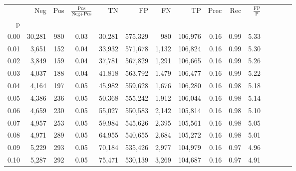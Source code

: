 \begin{tabular}{rrrcrrrrrrrrrrr}
\toprule
{} &     Neg &    Pos & $\frac{\text{Pos}}{\text{Neg}+\text{Pos}}$ &       TN &       FP &       FN &       TP &  Prec &   Rec & $\frac{\text{FP}}{\text{P}}$ \\
p    &         &        &                                            &          &          &          &          &       &       &                              \\
\midrule
0.00 &  30,281 &    980 &                                       0.03 &   30,281 &  575,329 &      980 &  106,976 &  0.16 &  0.99 &                         5.33 \\
0.01 &   3,651 &    152 &                                       0.04 &   33,932 &  571,678 &    1,132 &  106,824 &  0.16 &  0.99 &                         5.30 \\
0.02 &   3,849 &    159 &                                       0.04 &   37,781 &  567,829 &    1,291 &  106,665 &  0.16 &  0.99 &                         5.26 \\
0.03 &   4,037 &    188 &                                       0.04 &   41,818 &  563,792 &    1,479 &  106,477 &  0.16 &  0.99 &                         5.22 \\
0.04 &   4,164 &    197 &                                       0.05 &   45,982 &  559,628 &    1,676 &  106,280 &  0.16 &  0.98 &                         5.18 \\
0.05 &   4,386 &    236 &                                       0.05 &   50,368 &  555,242 &    1,912 &  106,044 &  0.16 &  0.98 &                         5.14 \\
0.06 &   4,659 &    230 &                                       0.05 &   55,027 &  550,583 &    2,142 &  105,814 &  0.16 &  0.98 &                         5.10 \\
0.07 &   4,957 &    253 &                                       0.05 &   59,984 &  545,626 &    2,395 &  105,561 &  0.16 &  0.98 &                         5.05 \\
0.08 &   4,971 &    289 &                                       0.05 &   64,955 &  540,655 &    2,684 &  105,272 &  0.16 &  0.98 &                         5.01 \\
0.09 &   5,229 &    293 &                                       0.05 &   70,184 &  535,426 &    2,977 &  104,979 &  0.16 &  0.97 &                         4.96 \\
0.10 &   5,287 &    292 &                                       0.05 &   75,471 &  530,139 &    3,269 &  104,687 &  0.16 &  0.97 &                         4.91 \\

\end{tabular}
